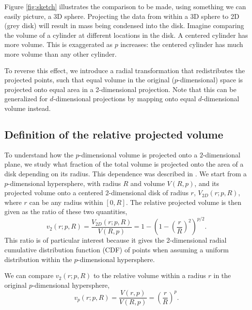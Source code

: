 \documentclass[]{interact}
\theoremstyle{plain}%
\theoremstyle{definition}
\theoremstyle{remark}
\begin{document}
Figure \ref{fig:sketch} illustrates the comparison to be made, using
something we can easily picture, a 3D sphere. Projecting the data from
within a 3D sphere to 2D (grey disk) will result in mass being condensed
into the disk. Imagine comparing the volume of a cylinder at different
locations in the disk. A centered cylinder has more volume. This is
exaggerated as \(p\) increases: the centered cylinder has much more
volume than any other cylinder.

To reverse this effect, we introduce a radial transformation that
redistributes the projected points, such that equal volume in the
original (\(p\)-dimensional) space is projected onto equal area in a
2-dimensional projection. Note that this can be generalized for
\(d\)-dimensional projections by mapping onto equal \(d\)-dimensional
volume instead.

\hypertarget{definition-of-the-relative-projected-volume}{%
\subsection{Definition of the relative projected
volume}\label{definition-of-the-relative-projected-volume}}

To understand how the \(p\)-dimensional volume is projected onto a
\(2\)-dimensional plane, we study what fraction of the total volume is
projected onto the area of a disk depending on its radius. This
dependence was described in \citet{Laa:2020wkm}. We start from a
\(p\)-dimensional hypersphere, with radius \(R\) and volume \(V(R, p)\),
and its projected volume onto a centered \(2\)-dimensional disk of
radius \(r\), \(V_{2D}(r; p, R)\), where \(r\) can be any radius within
\([0, R]\). The relative projected volume is then given as the ratio of
these two quantities, \begin{equation}
v_{2} (r; p, R) = \frac{V_{2D}(r; p, R)}{V(R, p)} = 1 - \left(1-\left(\frac{r}{R}\right)^2\right)^{p/2}.
\label{eq:cdf}
\end{equation} This ratio is of particular interest because it gives the
2-dimensional radial cumulative distribution function (CDF) of points
when assuming a uniform distribution within the \(p\)-dimensional
hypersphere.

We can compare \(v_{2} (r; p, R)\) to the relative volume within a
radius \(r\) in the original \(p\)-dimensional hypersphere,
\begin{equation}
v_{p} (r; p, R) = \frac{V(r, p)}{V(R, p)} = \left({\frac{r}{R}}\right)^p.
\label{eq:vp}
\end{equation}
\end{document}
